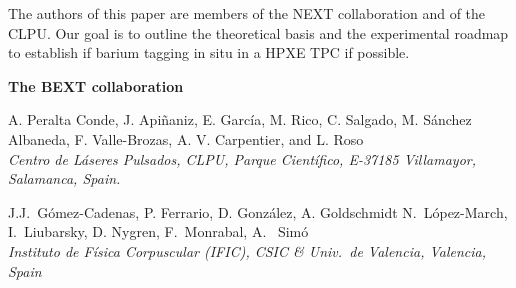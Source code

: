 \begin{titlepage}
\begin{center}
\begin{minipage}{15cm}
The authors of this paper are members of the NEXT collaboration and of the CLPU. Our goal is to outline the theoretical basis and the experimental roadmap to establish if barium tagging in situ in a HPXE TPC if possible.  

\end{minipage}
\end{center}

\begin{center}
\pagebreak 

{\LARGE \bf The BEXT collaboration}

\vspace{0.4cm}

{\small \sc A. Peralta Conde, J. Api\~naniz, E. Garc\'ia,  M. Rico, C. Salgado, M. S\'anchez Albaneda, F. Valle-Brozas, A. V. Carpentier, and L. Roso}\\
{\it Centro de L\'aseres Pulsados, CLPU, Parque Cient\'ifico, E-37185 Villamayor, Salamanca, Spain.}

\vspace{0.3cm}

{\small \sc  J.J.~G\'omez-Cadenas, P. Ferrario, D. Gonz\'alez, A. Goldschmidt N.~L\'opez-March,  \\I.~Liubarsky, D. Nygren, F.~Monrabal, A. ~Simó}\\
{\it Instituto de F\'isica Corpuscular (IFIC), CSIC \& Univ.\ de Valencia, Valencia, Spain}

\end{center}




\end{titlepage}
